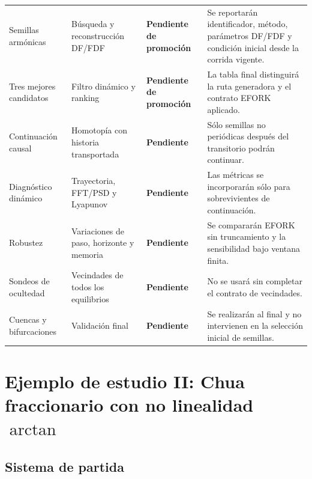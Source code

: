 \documentclass[journal]{IEEEtran}
\begin{document}
\begin{table}[htbp]
\begin{adjustbox}{max width=\textwidth}
\begin{tabular}{@{}L{2.7cm}L{3.4cm}L{4.4cm}L{5.8cm}@{}}
Semillas armónicas &
Búsqueda y reconstrucción DF/FDF &
\textbf{Pendiente de promoción} &
Se reportarán identificador, método, parámetros DF/FDF y condición inicial desde la corrida vigente. \\

Tres mejores candidatos &
Filtro dinámico y ranking &
\textbf{Pendiente de promoción} &
La tabla final distinguirá la ruta generadora y el contrato EFORK aplicado. \\

Continuación causal &
Homotopía con historia transportada &
\textbf{Pendiente} &
Sólo semillas no periódicas después del transitorio podrán continuar. \\

Diagnóstico dinámico &
Trayectoria, FFT/PSD y Lyapunov &
\textbf{Pendiente} &
Las métricas se incorporarán sólo para sobrevivientes de continuación. \\

Robustez &
Variaciones de paso, horizonte y memoria &
\textbf{Pendiente} &
Se compararán EFORK sin truncamiento y la sensibilidad bajo ventana finita. \\

Sondeos de ocultedad &
Vecindades de todos los equilibrios &
\textbf{Pendiente} &
No se usará  sin completar el contrato de vecindades. \\

Cuencas y bifurcaciones &
Validación final &
\textbf{Pendiente} &
Se realizarán al final y no intervienen en la selección inicial de semillas. \\

\bottomrule
\end{tabular}
\end{adjustbox}
\end{table}

\section{Ejemplo de estudio II: Chua fraccionario con no linealidad \texorpdfstring{$\arctan$}{arctan}}
\label{sec:chua_arctan_frac}

\subsection{Sistema de partida}
\end{document}
